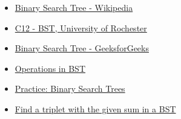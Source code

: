 \documentclass[11pt]{article}
\begin{document}
\begin{itemize}
    \item \href{https://en.wikipedia.org/wiki/Binary_search_tree}{Binary Search Tree - Wikipedia}

    \item \href{https://www.cs.rochester.edu/u/gildea/csc282/slides/C12-bst.pdf}{C12 - BST, University of Rochester}

    \item \href{https://www.geeksforgeeks.org/binary-search-tree-data-structure/}{Binary Search Tree - GeeksforGeeks}

    \item \href{https://www.techiedelight.com/}{Operations in BST}

    \item \href{https://codeforces.com/}{Practice: Binary Search Trees}

    \item \href{https://www.techiedelight.com/find-triplet-with-given-sum-bst/}{Find a triplet with the given sum in a BST}

\end{itemize}

 
	
\end{document}
